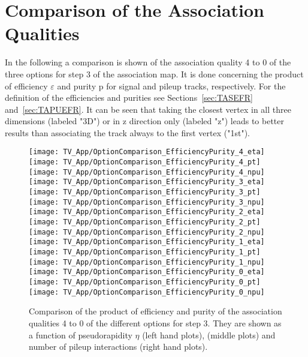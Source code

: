 \chapter{Comparison of the Association Qualities\label{sec:TrackAss_App} }

In the following a comparison is shown of the association quality 4 to 0 of the three options for step 3 of the association map. It is done concerning the product of efficiency $\varepsilon$ and purity p for signal and pileup tracks, respectively. For the definition of the efficiencies and purities see Sections~\ref{sec:TASEFR} and~\ref{sec:TAPUEFR}. It can be seen that taking the closest vertex in all three dimensions (labeled "3D") or in z direction only (labeled "z") leads to better results than associating the track always to the first vertex ("1st").

\begin{figure}[!h]
  \centering
  \texttt{[image: TV\_App/OptionComparison\_EfficiencyPurity\_4\_eta]}
  \texttt{[image: TV\_App/OptionComparison\_EfficiencyPurity\_4\_pt]}
  \texttt{[image: TV\_App/OptionComparison\_EfficiencyPurity\_4\_npu]}
  \\
  \texttt{[image: TV\_App/OptionComparison\_EfficiencyPurity\_3\_eta]}
  \texttt{[image: TV\_App/OptionComparison\_EfficiencyPurity\_3\_pt]}
  \texttt{[image: TV\_App/OptionComparison\_EfficiencyPurity\_3\_npu]}
  \\
  \texttt{[image: TV\_App/OptionComparison\_EfficiencyPurity\_2\_eta]}
  \texttt{[image: TV\_App/OptionComparison\_EfficiencyPurity\_2\_pt]}
  \texttt{[image: TV\_App/OptionComparison\_EfficiencyPurity\_2\_npu]}
  \\
  \texttt{[image: TV\_App/OptionComparison\_EfficiencyPurity\_1\_eta]}
  \texttt{[image: TV\_App/OptionComparison\_EfficiencyPurity\_1\_pt]}
  \texttt{[image: TV\_App/OptionComparison\_EfficiencyPurity\_1\_npu]}
  \\
  \texttt{[image: TV\_App/OptionComparison\_EfficiencyPurity\_0\_eta]}
  \texttt{[image: TV\_App/OptionComparison\_EfficiencyPurity\_0\_pt]}
  \texttt{[image: TV\_App/OptionComparison\_EfficiencyPurity\_0\_npu]}
  \\
\caption[Comparison of the association qualities 4 to 0 of the different options for step 3 of the association map.]{Comparison of the product of efficiency and purity of the association qualities 4 to 0 of the different options for step 3. They are shown as a function of pseudorapidity $\eta$ (left hand plots), \pt{} (middle plots) and number of pileup interactions (right hand plots). \label{sec:TrackAss_AppSignal}}
\end{figure}

